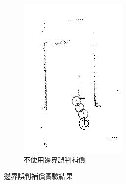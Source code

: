 \begin{figure}[h!]
\begin{subfigure}[t]{0.48\textwidth}
		\includegraphics[width=\textwidth]{figures/experiments/path_closest_NoComp}
		\caption{不使用邊界誤判補償}
		\label{f:exp:closest_NoComp}
	\end{subfigure}
	\caption{邊界誤判補償實驗結果}
\end{figure}

